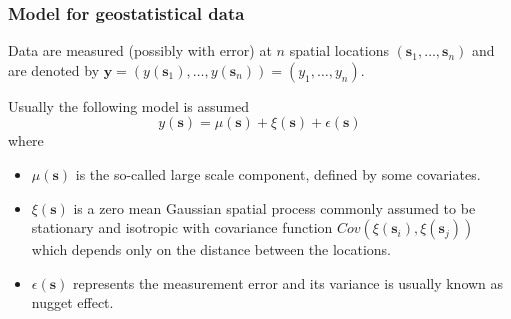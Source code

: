 \documentclass[slidestop,compress,serif,10pt]{beamer}
\begin{document}
\begin{frame}
\frametitle{Model for geostatistical data}
Data are measured (possibly with error) at $n$ spatial locations $(\bm s_{1},\ldots,\bm s_{n})$ and are denoted by $\bm y=\left(y(\bm s_1),\ldots, y(\bm s_n)\right)=(y_1,\ldots,y_n)$.

Usually the following model is assumed
\[
y(\bm s) = \mu(\bm s) + \xi(\bm s) +\epsilon(\bm s)
\]
 where
\begin{itemize}

\item $\mu(\bm s)$  is the so-called large scale component, defined by some covariates.
\item $\xi(\bm s)$  is a zero mean Gaussian spatial process commonly assumed to be stationary and isotropic with covariance function $Cov(\xi(\bm s_i),\xi(\bm s_j))$  which depends only on the distance between the locations.
\item $\epsilon (\bm s)$  represents the measurement error and its variance is usually known as nugget effect.
\end{itemize}

\end{frame}
\end{document}
